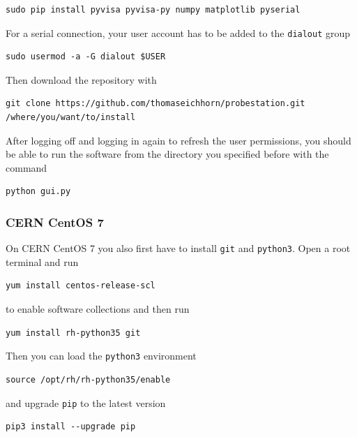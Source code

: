 \documentclass[a4paper]{article}
\begin{document}
\medskip
\begin{lstlisting}
sudo pip install pyvisa pyvisa-py numpy matplotlib pyserial
\end{lstlisting}
\medskip

For a serial connection, your user account has to be added to the {\tt dialout} group

\medskip
\begin{lstlisting}
sudo usermod -a -G dialout $USER
\end{lstlisting}
\medskip

Then download the repository with

\medskip
\begin{lstlisting}
git clone https://github.com/thomaseichhorn/probestation.git /where/you/want/to/install
\end{lstlisting}
\medskip

After logging off and logging in again to refresh the user permissions, you should be able to run the software from the directory you specified before with the command

\medskip
\begin{lstlisting}
python gui.py
\end{lstlisting}
\medskip

\subsubsection{CERN CentOS 7}

On CERN CentOS 7 you also first have to install {\tt git} and {\tt python3}.
Open a root terminal and run

\medskip
\begin{lstlisting}
yum install centos-release-scl
\end{lstlisting}
\medskip

to enable software collections and then run

\medskip
\begin{lstlisting}
yum install rh-python35 git
\end{lstlisting}
\medskip

Then you can load the {\tt python3} environment

\medskip
\begin{lstlisting}
source /opt/rh/rh-python35/enable
\end{lstlisting}
\medskip

and upgrade {\tt pip} to the latest version

\medskip
\begin{lstlisting}
pip3 install --upgrade pip
\end{lstlisting}
\medskip
\end{document}
